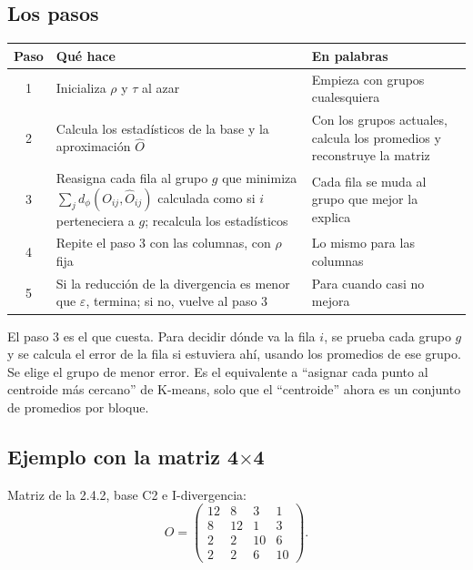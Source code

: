 \documentclass[11pt,a4paper]{article}
\begin{document}
\subsection{Los pasos}

\begin{center}
\renewcommand{\arraystretch}{1.3}
\begin{tabular}{@{}c>{\raggedright\arraybackslash}p{6.4cm}>{\raggedright\arraybackslash}p{6.4cm}@{}}
\toprule
\textbf{Paso} & \textbf{Qué hace} & \textbf{En palabras} \\
\midrule
1 & Inicializa $\rho$ y $\tau$ al azar & Empieza con grupos cualesquiera \\
\midrule
2 & Calcula los estadísticos de la base y la aproximación $\hat O$ & Con los grupos actuales, calcula los promedios y reconstruye la matriz \\
\midrule
3 & Reasigna cada fila al grupo $g$ que minimiza $\sum_j d_\phi(O_{ij},\hat O_{ij})$ calculada como si $i$ perteneciera a $g$; recalcula los estadísticos & Cada fila se muda al grupo que mejor la explica \\
\midrule
4 & Repite el paso 3 con las columnas, con $\rho$ fija & Lo mismo para las columnas \\
\midrule
5 & Si la reducción de la divergencia es menor que $\varepsilon$, termina; si no, vuelve al paso 3 & Para cuando casi no mejora \\
\bottomrule
\end{tabular}
\end{center}

El paso 3 es el que cuesta. Para decidir dónde va la fila $i$, se prueba cada
grupo $g$ y se calcula el error de la fila si estuviera ahí, usando los promedios
de ese grupo. Se elige el grupo de menor error. Es el equivalente a ``asignar cada
punto al centroide más cercano'' de K-means, solo que el ``centroide'' ahora es un
conjunto de promedios por bloque.

\subsection{Ejemplo con la matriz 4$\times$4}

Matriz de la 2.4.2, base C2 e I-divergencia:
\[
  O=\begin{pmatrix}
    12 & 8 & 3 & 1\\
    8 & 12 & 1 & 3\\
    2 & 2 & 10 & 6\\
    2 & 2 & 6 & 10
  \end{pmatrix}.
\]
\end{document}
